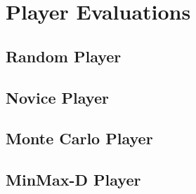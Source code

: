 \chapter{Player Evaluations}
\section{Random Player}
\section{Novice Player}
\section{Monte Carlo Player}
\section{MinMax-D Player}
